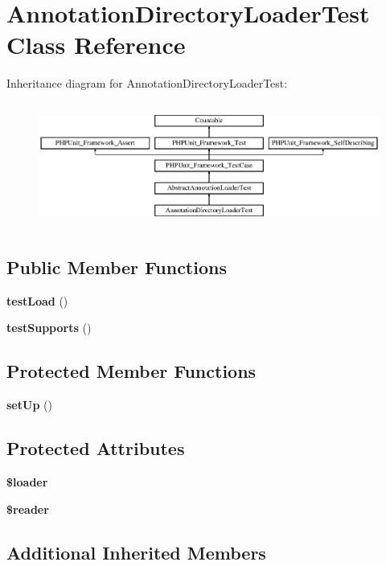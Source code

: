 \section{Annotation\+Directory\+Loader\+Test Class Reference}
\label{class_symfony_1_1_component_1_1_routing_1_1_tests_1_1_loader_1_1_annotation_directory_loader_test}
Inheritance diagram for Annotation\+Directory\+Loader\+Test\+:\begin{figure}[H]
\begin{center}
\leavevmode
\includegraphics[height=4.129793cm]{class_symfony_1_1_component_1_1_routing_1_1_tests_1_1_loader_1_1_annotation_directory_loader_test}
\end{center}
\end{figure}
\subsection*{Public Member Functions}
\begin{DoxyCompactItemize}
\item 
{\bf test\+Load} ()
\item 
{\bf test\+Supports} ()
\end{DoxyCompactItemize}
\subsection*{Protected Member Functions}
\begin{DoxyCompactItemize}
\item 
{\bf set\+Up} ()
\end{DoxyCompactItemize}
\subsection*{Protected Attributes}
\begin{DoxyCompactItemize}
\item 
{\bf \$loader}
\item 
{\bf \$reader}
\end{DoxyCompactItemize}
\subsection*{Additional Inherited Members}


